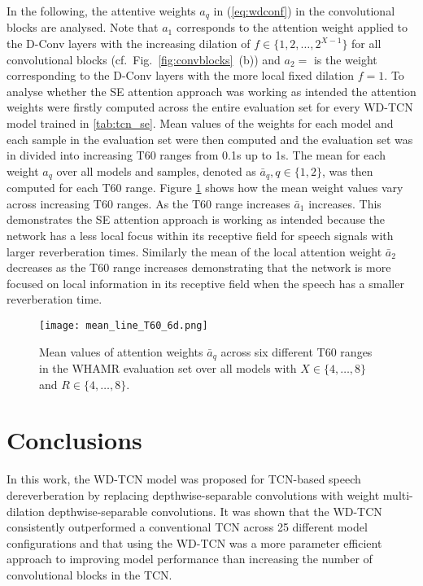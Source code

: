 \documentclass{article}
\begin{document}
In the following, the attentive weights $a_q$ in (\ref{eq:wdconf}) in the convolutional blocks are analysed. Note that $a_1$ corresponds to the attention weight applied to the \ac{D-Conv} layers with the increasing dilation of $f\in\{1,2,\ldots,2^{X-1}\}$ for all convolutional blocks (cf.~Fig.~\ref{fig:convblocks}~(b)) and $a_2=$ is the weight corresponding to the \ac{D-Conv} layers with the more local fixed dilation $f=1$.
To analyse whether the \ac{SE} attention approach was working as intended the attention weights were firstly computed across the entire evaluation set for every WD-TCN model trained in  \autoref{tab:tcn_se}. Mean values of the weights for each model and each sample in the evaluation set were then computed and the evaluation set was in divided into increasing T60 ranges from 0.1s up to 1s. The mean for each  weight $a_q$ over all models and samples, denoted as $\bar{a}_q, q\in \{1,2\}$, was then computed for each T60 range. Figure \ref{fig:meanvsT60} shows how the mean weight values vary across increasing T60 ranges. As the T60 range increases $\bar{a}_1$ increases. This demonstrates the \ac{SE} attention approach is working as intended because the network has a less local focus within its receptive field for speech signals with larger reverberation times. Similarly the mean of the local attention weight $\bar{a}_2$ decreases as the T60 range increases demonstrating that the network is more focused on local information in its receptive field when the speech has a smaller reverberation time.
\begin{figure}[!ht]
    \centering
    \texttt{[image: mean\_line\_T60\_6d.png]}
    \caption{Mean values of attention weights $\bar{a}_q$ across six different T60 ranges in the WHAMR evaluation set over all models with $X\in\{4,\ldots,8\}$ and $R\in\{4,\ldots,8\}$.}
    \label{fig:meanvsT60}
\end{figure}
\section{Conclusions}
\label{sec:conclusions}
In this work, the \ac{WD-TCN} model was proposed for \ac{TCN}-based speech dereverberation by replacing depthwise-separable convolutions with weight multi-dilation depthwise-separable convolutions. It was shown that the \ac{WD-TCN} consistently outperformed a conventional \ac{TCN} across 25 different model configurations and that using the \ac{WD-TCN} was a more parameter efficient approach to improving model performance than increasing the number of convolutional blocks in the \ac{TCN}.






\end{document}
